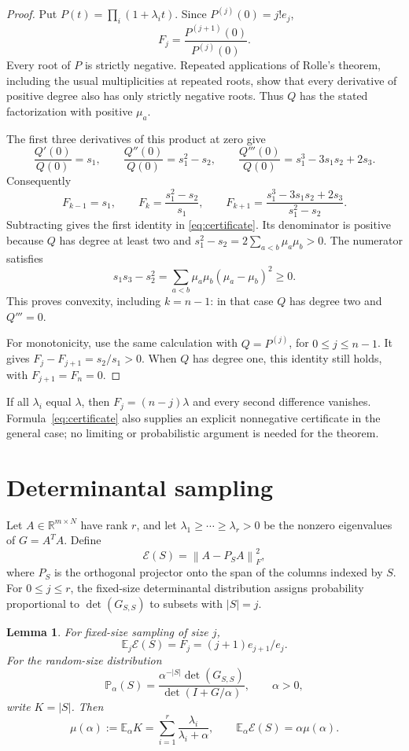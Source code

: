 \documentclass[11pt]{article}
\newtheorem{lemma}[theorem]{Lemma}
\theoremstyle{definition}
\newcommand{\R}{\mathbb R}
\newcommand{\E}{\mathbb E}
\newcommand{\Prob}{\mathbb P}
\newcommand{\norm}[1]{\left\lVert#1\right\rVert}
\begin{document}
\begin{proof}
Put $P(t)=\prod_i(1+\lambda_i t)$. Since $P^{(j)}(0)=j!e_j$,
\[
 F_j=\frac{P^{(j+1)}(0)}{P^{(j)}(0)}.
\]
Every root of $P$ is strictly negative. Repeated applications of Rolle's theorem, including the usual multiplicities at repeated roots, show that every derivative of positive degree also has only strictly negative roots. Thus $Q$ has the stated factorization with positive $\mu_a$.

The first three derivatives of this product at zero give
\[
 \frac{Q'(0)}{Q(0)}=s_1,\qquad
 \frac{Q''(0)}{Q(0)}=s_1^2-s_2,\qquad
 \frac{Q'''(0)}{Q(0)}=s_1^3-3s_1s_2+2s_3.
\]
Consequently
\[
 F_{k-1}=s_1,\qquad
 F_k=\frac{s_1^2-s_2}{s_1},\qquad
 F_{k+1}=\frac{s_1^3-3s_1s_2+2s_3}{s_1^2-s_2}.
\]
Subtracting gives the first identity in \eqref{eq:certificate}. Its denominator is positive because $Q$ has degree at least two and
$s_1^2-s_2=2\sum_{a<b}\mu_a\mu_b>0$. The numerator satisfies
\[
 s_1s_3-s_2^2=\sum_{a<b}\mu_a\mu_b(\mu_a-\mu_b)^2\ge0.
\]
This proves convexity, including $k=n-1$: in that case $Q$ has degree two and $Q'''=0$.

For monotonicity, use the same calculation with $Q=P^{(j)}$, for $0\le j\le n-1$. It gives $F_j-F_{j+1}=s_2/s_1>0$. When $Q$ has degree one, this identity still holds, with $F_{j+1}=F_n=0$.
\end{proof}

If all $\lambda_i$ equal $\lambda$, then $F_j=(n-j)\lambda$ and every second difference vanishes. Formula~\eqref{eq:certificate} also supplies an explicit nonnegative certificate in the general case; no limiting or probabilistic argument is needed for the theorem.

\section{Determinantal sampling}
Let $A\in\R^{m\times N}$ have rank $r$, and let $\lambda_1\ge\cdots\ge\lambda_r>0$ be the nonzero eigenvalues of $G=A^TA$. Define
\[
 \mathcal E(S)=\norm{A-P_SA}_F^2,
\]
where $P_S$ is the orthogonal projector onto the span of the columns indexed by $S$. For $0\le j\le r$, the fixed-size determinantal distribution assigns probability proportional to $\det(G_{S,S})$ to subsets with $|S|=j$.

\begin{lemma}\label{lem:expectations}
For fixed-size sampling of size $j$,
\[
 \E_j\mathcal E(S)=F_j=(j+1)e_{j+1}/e_j.
\]
For the random-size distribution
\[
 \Prob_\alpha(S)=\frac{\alpha^{-|S|}\det(G_{S,S})}{\det(I+G/\alpha)},
 \qquad \alpha>0,
\]
write $K=|S|$. Then
\begin{equation}\label{eq:dpp}
 \mu(\alpha):=\E_\alpha K=\sum_{i=1}^r\frac{\lambda_i}{\lambda_i+\alpha},
 \qquad \E_\alpha\mathcal E(S)=\alpha\mu(\alpha).
\end{equation}
\end{lemma}
\end{document}
